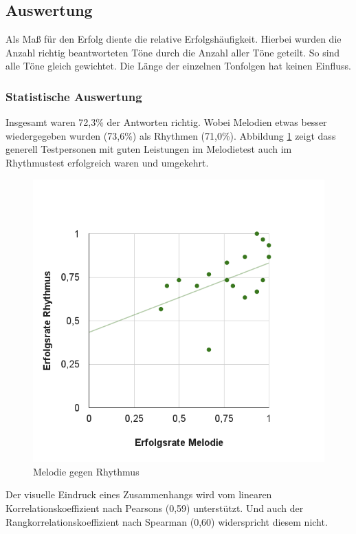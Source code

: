 \documentclass{acm_proc_article-sp}
\begin{document}
\subsection{Auswertung}
Als Maß für den Erfolg diente die relative Erfolgshäufigkeit. Hierbei wurden die Anzahl richtig beantworteten Töne durch die Anzahl aller Töne geteilt. So sind alle Töne gleich gewichtet. Die Länge der einzelnen Tonfolgen hat keinen Einfluss.
\subsubsection{Statistische Auswertung}
Insgesamt waren 72,3\% der Antworten richtig. Wobei Melodien etwas besser wiedergegeben wurden (73,6\%) als Rhythmen (71,0\%). Abbildung \ref{MelodieGegenRhythmus} zeigt dass generell Testpersonen mit guten Leistungen im Melodietest auch im Rhythmustest erfolgreich waren und umgekehrt.
\begin{figure}[H]
\includegraphics[width=1.0\linewidth]{Abbildungen/Melodie-Rhythmus.png}
\caption{Melodie gegen Rhythmus}
\label{MelodieGegenRhythmus}
\end{figure}
Der visuelle Eindruck eines Zusammenhangs wird vom linearen Korrelationskoeffizient nach Pearsons \cite{wiki:korrelationskoeffizient} (0,59) unterstützt. Und auch der Rangkorrelationskoeffizient nach Spearman \cite{wiki:rangkorrelationskoeffizient} (0,60) widerspricht diesem nicht.\\
\end{document}
